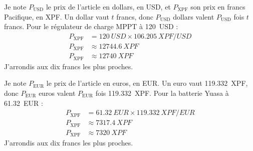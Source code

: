 \begin{demonstration}
Je note $P_{\text{USD}}$ le prix de l'article en dollars, en USD, et $P_{\text{XPF}}$ son prix en francs Pacifique, en XPF. Un dollar vaut $t$ francs, donc $P_{\text{USD}}$ dollars valent $P_{\text{USD}}$ fois $t$ francs. Pour le régulateur de charge MPPT à \qty{120}{USD} :
\begin{align*}
P_{\text{XPF}} &= \qty{120}{USD} \times \qty{106,205}{XPF/USD}\\
P_{\text{XPF}} &\approx \qty{12744,6}{XPF}\\
P_{\text{XPF}} &\approx \qty{12740}{XPF}
\end{align*}
J'arrondis aux dix francs les plus proches.
\end{demonstration}

\begin{demonstration}
Je note $P_{\text{EUR}}$ le prix de l'article en euros, en EUR. Un euro vaut \qty{119,332}{XPF}, donc $P_{\text{EUR}}$ euros valent $P_{\text{EUR}}$ fois \qty{119,332}{XPF}. Pour la batterie Yuasa à \qty{61,32}{EUR} :
\begin{align*}
P_{\text{XPF}} &= \qty{61,32}{EUR} \times \qty{119,332}{XPF/EUR}\\
P_{\text{XPF}} &\approx \qty{7317,4}{XPF}\\
P_{\text{XPF}} &\approx \qty{7320}{XPF}
\end{align*}
J'arrondis aux dix francs les plus proches.
\end{demonstration}

